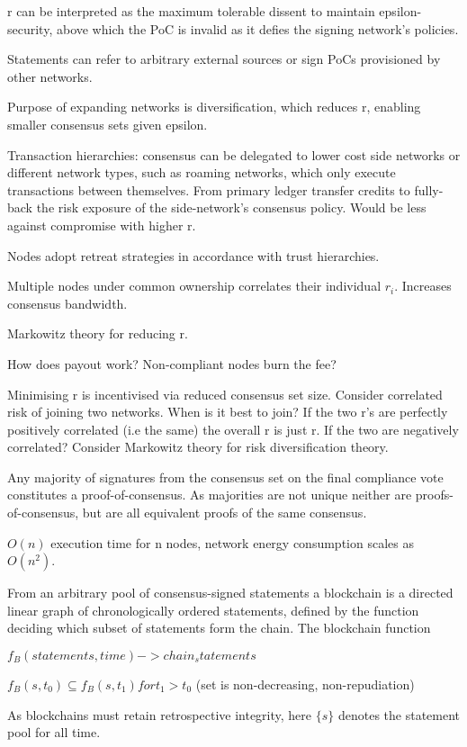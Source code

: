 r can be interpreted as the maximum tolerable dissent to maintain epsilon-security, above which the PoC is invalid as it defies the signing network’s policies.

Statements can refer to arbitrary external sources or sign PoCs provisioned by other networks.

Purpose of expanding networks is diversification, which reduces r, enabling smaller consensus sets given epsilon.

Transaction hierarchies: consensus can be delegated to lower cost side networks or different network types, such as roaming networks, which only execute transactions between themselves. From primary ledger transfer credits to fully-back the risk exposure of the side-network’s consensus policy.
Would be less against compromise with higher r.

Nodes adopt retreat strategies in accordance with trust hierarchies.

Multiple nodes under common ownership correlates their individual $r_i$. Increases consensus bandwidth.

Markowitz theory for reducing r.

How does payout work? Non-compliant nodes burn the fee?

Minimising r is incentivised via reduced consensus set size. Consider correlated risk of joining two networks. When is it best to join? If the two r’s are perfectly positively correlated (i.e the same) the overall r is just r. If the two are negatively correlated? Consider Markowitz theory for risk diversification theory.

Any majority of signatures from the consensus set on the final compliance vote constitutes a proof-of-consensus. As majorities are not unique neither are proofs-of-consensus, but are all equivalent proofs of the same consensus.

$O(n)$ execution time for n nodes, network energy consumption scales as $O(n^2)$.

From an arbitrary pool of consensus-signed statements a blockchain is a directed linear graph of chronologically ordered statements, defined by the function deciding which subset of statements form the chain. The blockchain function

$f_B({statements},time) -> {chain_statements}$

$f_B({s},t_0) \subseteq f_B({s},t_1) for t_1>t_0$
(set is non-decreasing, non-repudiation)

As blockchains must retain retrospective integrity, here $\{s\}$ denotes the statement pool for all time.

